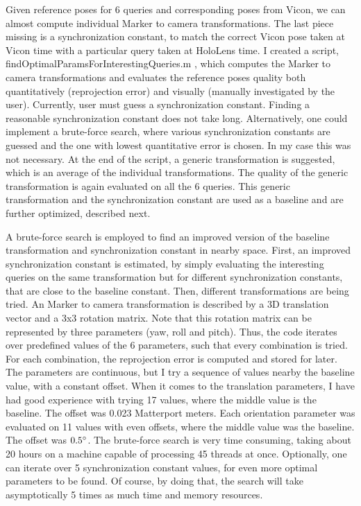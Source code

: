 \documentclass[twoside]{ctuthesis}
\theoremstyle{plain}
\theoremstyle{definition}
\theoremstyle{note}
\newcommand{\code}[1]{{\ttfamily #1%
}}
\begin{document}
Given reference poses for 6 queries and corresponding poses from Vicon, we can almost compute individual Marker to camera transformations. The last piece missing is a synchronization constant, to match the correct Vicon pose taken at Vicon time with a particular query taken at HoloLens time. I created a script, \code{findOptimalParamsForInterestingQueries.m}, which computes the Marker to camera transformations and evaluates the reference poses quality both quantitatively (reprojection error) and visually (manually investigated by the user). Currently, user must guess a synchronization constant. Finding a reasonable synchronization constant does not take long. Alternatively, one could implement a brute-force search, where various synchronization constants are guessed and the one with lowest quantitative error is chosen. In my case this was not necessary. At the end of the script, a generic transformation is suggested, which is an average of the individual transformations. The quality of the generic transformation is again evaluated on all the 6 queries. This generic transformation and the synchronization constant are used as a baseline and are further optimized, described next.

A brute-force search is employed to find an improved version of the baseline transformation and synchronization constant in nearby space. First, an improved synchronization constant is estimated, by simply evaluating the interesting queries on the same transformation but for different synchronization constants, that are close to the baseline constant. Then, different transformations are being tried. An Marker to camera transformation is described by a 3D translation vector and a 3x3 rotation matrix. Note that this rotation matrix can be represented by three parameters (yaw, roll and pitch). Thus, the code iterates over predefined values of the 6 parameters, such that every combination is tried. For each combination, the reprojection error is computed and stored for later. The parameters are continuous, but I try a sequence of values nearby the baseline value, with a constant offset. When it comes to the translation parameters, I have had good experience with trying 17 values, where the middle value is the baseline. The offset was 0.023 Matterport meters. Each orientation parameter was evaluated on 11 values with even offsets, where the middle value was the baseline. The offset was $0.5\degree$. The brute-force search is very time consuming, taking about 20 hours on a machine capable of processing 45 threads at once. Optionally, one can iterate over 5 synchronization constant values, for even more optimal parameters to be found. Of course, by doing that, the search will take asymptotically 5 times as much time and memory resources.
\end{document}
